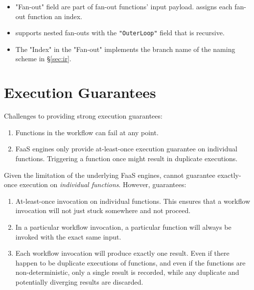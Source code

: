 \begin{itemize}
    \item "Fan-out" field are part of fan-out functions' input payload.
    \name{} assigns each fan-out function an index.

    \item \name{} supports nested fan-outs with the \texttt{"OuterLoop"} field
    that is recursive.

    \item The "Index" in the "Fan-out" implements the branch name of the
    naming scheme in
    \S\ref{sec:ir}.

\end{itemize}

\section{Execution Guarantees}

Challenges to providing strong execution guarantees:

\begin{enumerate}

    \item Functions in the workflow can fail at any point.

    \item FaaS engines only provide at-least-once execution guarantee on
    individual functions. Triggering a function once might result in duplicate
    executions.

\end{enumerate}

Given the limitation of the underlying FaaS engines, \name{} cannot guarantee
exactly-once execution on \emph{individual functions}. However, \name{}
guarantees:

\begin{enumerate}

    \item At-least-once invocation on individual functions. This ensures that a
    workflow invocation will not just stuck somewhere and not proceed.

    \item In a particular workflow invocation, a particular function will
    always be invoked with the exact same input.

    \item Each workflow invocation will produce exactly one result. Even if
    there happen to be duplicate executions of functions, and even if the
    functions are non-deterministic, only a single result is recorded, while
    any duplicate and potentially diverging results are discarded.

\end{enumerate}

